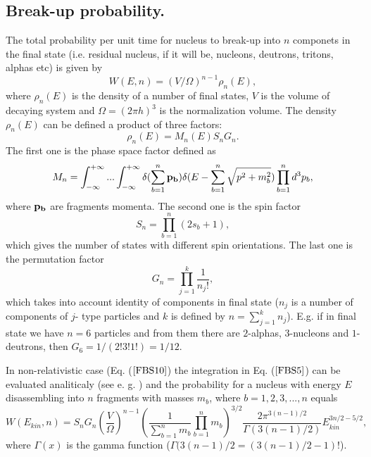 \subsection{Break-up probability.} 

\hspace{1.0em}The total  probability per unit time for nucleus to
break-up into $n$ componets in the final state (i.e. residual nucleus,
if it will be, nucleons, deutrons, tritons, alphas etc) is given by
\begin{equation}
\label{FBS3}W(E,n) = (V/\Omega)^{n-1}\rho_{n}(E),
\end{equation}
where $\rho_{n}(E)$ is the density of a number of final states, $V$ is
the volume of decaying system and $\Omega = (2\pi h)^{3}$ is the
normalization volume.  The density $\rho_{n}(E)$ can be defined a
product of three factors:
\begin{equation}
\label{FBS4}\rho_{n}(E)=M_{n}(E)S_nG_n.
\end{equation}
The first one is the phase space factor defined as
\begin{equation}
\label{FBS5}M_{n} = \int_{-\infty}^{+\infty}...\int_{-\infty}^{+\infty}
\delta(\sum_{b=1}^{n} {\bf p_{b}}) \delta(E-\sum_{b=1}^{n}\sqrt{p^2+m^2_b})
\prod_{b=1}^{n} d^3p_b,
\end{equation}
where ${\bf p_b}$ are fragments momenta. The second one is the spin
factor
\begin{equation}
\label{FBS6} S_n = \prod_{b=1}^{n}(2s_b+1),
\end{equation}
which gives the number of states with different spin orientations.  The
last one is the permutation factor
\begin{equation}
\label{FBS7}G_n = \prod_{j=1}^{k}\frac{1}{n_j !},
\end{equation}
which takes into account identity of components in final state ($n_j$ is
a number of components of $j$- type particles and $k$ is defined by $n =
\sum_{j=1}^{k}n_{j}$). E.g. if in final state we have $n = 6$ particles
and from them there are $2$-alphas, $3$-nucleons and $1$-deutrons, then
$G_{6} = 1/(2! 3! 1!) = 1/12$.

In non-relativistic case (Eq. ($\ref{FBS10}$) the integration in
Eq. ($\ref{FBS5}$) can be evaluated analiticaly (see e. g. \cite{BBB58})
and the probability for a nucleus with energy $E$ disassembling into $n$
fragments with masses $m_b$, where $b = 1,2,3,...,n$ equals
\begin{equation}
\label{FBS8} W(E_{kin},n) = 
S_nG_n (\frac{V}{\Omega})^{n-1}(\frac{1}{\sum_{b=1}^{n}m_b}
\prod_{b=1}^{n}
m_{b})^{3/2}
 \frac{2\pi^{3(n-1)/2}}{\Gamma(3(n-1)/2)}E_{kin}^{3n/2-5/2}, 
\end{equation}
where $\Gamma(x)$ is the gamma function ($\Gamma(3(n-1)/2 =  (3(n-1)/2
- 1)!$).

